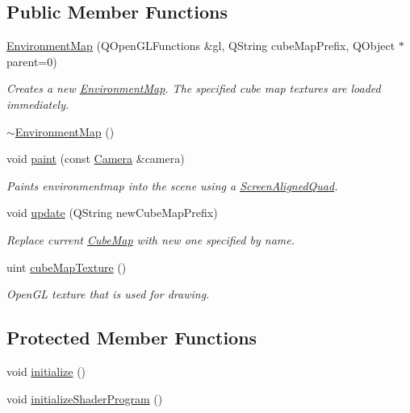 \subsection*{Public Member Functions}
\begin{DoxyCompactItemize}
\item 
\hyperlink{class_environment_map_a54b674f88e757c7293abd2f52f518183}{Environment\+Map} (Q\+Open\+G\+L\+Functions \&gl, Q\+String cube\+Map\+Prefix, Q\+Object $\ast$parent=0)
\begin{DoxyCompactList}\small\item\em Creates a new \hyperlink{class_environment_map}{Environment\+Map}. The specified cube map textures are loaded immediately. \end{DoxyCompactList}\item 
\hyperlink{class_environment_map_a77218340957b486754db0ff73f37c8da}{$\sim$\+Environment\+Map} ()
\item 
void \hyperlink{class_environment_map_a49b3996bb58c2e39befdea946402bbdd}{paint} (const \hyperlink{class_camera}{Camera} \&camera)
\begin{DoxyCompactList}\small\item\em Paints environmentmap into the scene using a \hyperlink{class_screen_aligned_quad}{Screen\+Aligned\+Quad}. \end{DoxyCompactList}\item 
void \hyperlink{class_environment_map_a700a5d20db46b88e2ad09675cfeb5a7f}{update} (Q\+String new\+Cube\+Map\+Prefix)
\begin{DoxyCompactList}\small\item\em Replace current \hyperlink{class_cube_map}{Cube\+Map} with new one specified by name. \end{DoxyCompactList}\item 
uint \hyperlink{class_environment_map_a49de5c6028aaf39124e6f6177aeff3db}{cube\+Map\+Texture} ()
\begin{DoxyCompactList}\small\item\em Open\+G\+L texture that is used for drawing. \end{DoxyCompactList}\end{DoxyCompactItemize}
\subsection*{Protected Member Functions}
\begin{DoxyCompactItemize}
\item 
void \hyperlink{class_environment_map_a718a9c79e383200989d22a580520fe80}{initialize} ()
\item 
void \hyperlink{class_environment_map_af348237ba84d4ac5ca45448b4a605357}{initialize\+Shader\+Program} ()
\end{DoxyCompactItemize}

